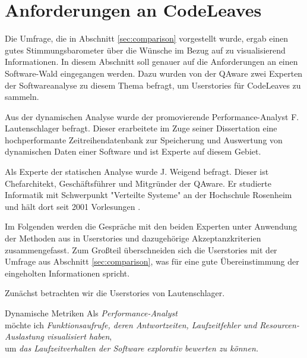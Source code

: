 \section{Anforderungen an CodeLeaves}
\label{sec:requirements}

Die Umfrage, die in Abschnitt \ref{sec:comparison} vorgestellt wurde, ergab einen gutes Stimmungsbarometer über die Wünsche im Bezug auf zu visualisierend Informationen. In diesem Abschnitt soll genauer auf die Anforderungen an einen Software-Wald eingegangen werden. Dazu wurden von der QAware zwei Experten der Softwareanalyse zu diesem Thema befragt, um Userstories für CodeLeaves zu sammeln.

Aus der dynamischen Analyse wurde der promovierende Performance-Analyst F. Lautenschlager befragt. Dieser erarbeitete im Zuge seiner Dissertation eine hochperformante Zeitreihendatenbank zur Speicherung und Auswertung von dynamischen Daten einer Software und ist Experte auf diesem Gebiet.

Als Experte der statischen Analyse wurde J. Weigend befragt. Dieser ist Chefarchitekt, Geschäftsführer und Mitgründer der QAware. Er studierte Informatik mit Schwerpunkt "Verteilte Systeme" an der Hochschule Rosenheim und hält dort seit 2001 Vorlesungen \cite{qaware2017johannes}.

Im Folgenden werden die Gespräche mit den beiden Experten unter Anwendung der Methoden aus \cite{cohn2004user} in Userstories und dazugehörige Akzeptanzkriterien zusammengefasst. Zum Großteil überschneiden sich die Userstories mit der Umfrage aus Abschnitt \ref{sec:comparison}, was für eine gute Übereinstimmung der eingeholten Informationen spricht.

Zunächst betrachten wir die Userstories von Lautenschlager.
\begin{userstory}{Dynamische Metriken}
  Als \textit{Performance-Analyst}\\
  möchte ich \textit{Funktionsaufrufe, deren Antwortzeiten, Laufzeitfehler und Resourcen-Auslastung visualisiert haben},\\
  um \textit{das Laufzeitverhalten der Software explorativ bewerten zu können.}
\end{userstory}
  
